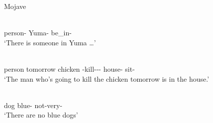 \begin{exe}\ex\label{MojExLoc} {Mojave} \citep[Yuman; Arizona; ][21, 212, 70]{Munro:1976}\nopagebreak[4]
 \begin{xlist}
\ex \gll{}  \\
person-\nom{} Yuma-\loc{} be\_in-\tns{}\\
\glt `There is someone in Yuma \dots' 

\ex\gll{}     \\
person tomorrow chicken \relativ{}-kill-\irr{}-\dem{}-\nom{} house-\loc{} sit-\tns{}\\
\glt `The man who's going to kill the chicken tomorrow is in the house.'

\ex\gll{}  \\
dog blue-\nom{} not-very-\augv{}\\
\glt `There are no blue dogs'
\end{xlist}
\end{exe}

